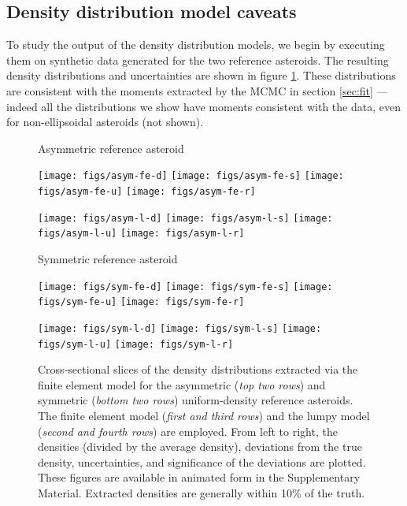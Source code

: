 \documentclass[fleqn,usenatbib]{mnras}
\begin{document}
\subsection{Density distribution model caveats}
\label{sec:density-compare}

To study the output of the density distribution models, we begin by executing them on synthetic data generated for the two reference asteroids. The resulting density distributions and uncertainties are shown in figure \ref{fig:den-uniform}. These distributions are consistent with the moments extracted by the MCMC in section \ref{sec:fit} --- indeed all the distributions we show have moments consistent with the data, even for non-ellipsoidal asteroids (not shown).

\begin{figure}
  Asymmetric reference asteroid

  \texttt{[image: figs/asym-fe-d]}\hfill
  \texttt{[image: figs/asym-fe-s]}\hfill
  \texttt{[image: figs/asym-fe-u]}\hfill
  \texttt{[image: figs/asym-fe-r]}
  
  \texttt{[image: figs/asym-l-d]}\hfill
  \texttt{[image: figs/asym-l-s]}\hfill
  \texttt{[image: figs/asym-l-u]}\hfill
  \texttt{[image: figs/asym-l-r]}

  \vspace{2em}
  Symmetric reference asteroid

  \texttt{[image: figs/sym-fe-d]}\hfill
  \texttt{[image: figs/sym-fe-s]}\hfill
  \texttt{[image: figs/sym-fe-u]}\hfill
  \texttt{[image: figs/sym-fe-r]}

  \texttt{[image: figs/sym-l-d]}\hfill
  \texttt{[image: figs/sym-l-s]}\hfill
  \texttt{[image: figs/sym-l-u]}\hfill
  \texttt{[image: figs/sym-l-r]}

  \caption{Cross-sectional slices of the density distributions extracted via the finite element model for the asymmetric (\textit{top two rows}) and symmetric (\textit{bottom two rows}) uniform-density reference asteroids. The finite element model (\textit{first and third rows}) and the lumpy model (\textit{second and fourth rows}) are employed. From left to right, the densities (divided by the average density), deviations from the true density, uncertainties, and significance of the deviations are plotted. These figures are available in animated form in the Supplementary Material. Extracted densities are generally within 10\% of the truth.}
  \label{fig:den-uniform}
\end{figure}
\end{document}
